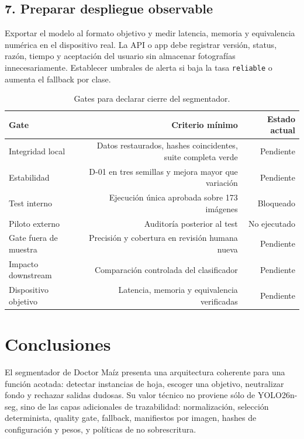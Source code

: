 \documentclass[11pt,a4paper]{article}
\begin{document}
\subsection{7. Preparar despliegue observable}

Exportar el modelo al formato objetivo y medir latencia, memoria y equivalencia numérica en el dispositivo real. La API o app debe registrar versión, status, razón, tiempo y aceptación del usuario sin almacenar fotografías innecesariamente. Establecer umbrales de alerta si baja la tasa \texttt{reliable} o aumenta el fallback por clase.


\begin{table}[H]
\centering
\caption{Gates para declarar cierre del segmentador.}
\small
\begin{tabular}{lrr}
\toprule
Gate & Criterio mínimo & Estado actual \\
\midrule
Integridad local & Datos restaurados, hashes coincidentes, suite completa verde & Pendiente \\
Estabilidad & D-01 en tres semillas y mejora mayor que variación & Pendiente \\
Test interno & Ejecución única aprobada sobre 173 imágenes & Bloqueado \\
Piloto externo & Auditoría posterior al test & No ejecutado \\
Gate fuera de muestra & Precisión y cobertura en revisión humana nueva & Pendiente \\
Impacto downstream & Comparación controlada del clasificador & Pendiente \\
Dispositivo objetivo & Latencia, memoria y equivalencia verificadas & Pendiente \\
\bottomrule
\end{tabular}
\end{table}

\section{Conclusiones}

El segmentador de Doctor Maíz presenta una arquitectura coherente para una función acotada: detectar instancias de hoja, escoger una objetivo, neutralizar fondo y rechazar salidas dudosas. Su valor técnico no proviene sólo de YOLO26n-seg, sino de las capas adicionales de trazabilidad: normalización, selección determinista, quality gate, fallback, manifiestos por imagen, hashes de configuración y pesos, y políticas de no sobrescritura.
\end{document}
